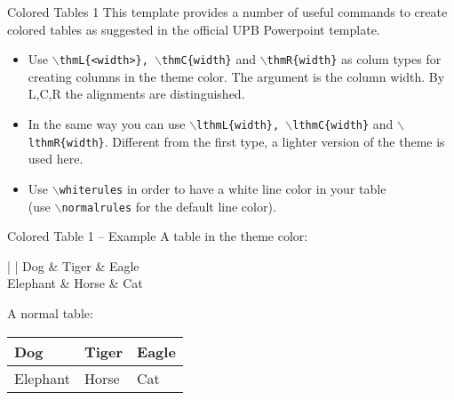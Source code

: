 \documentclass[
		aspectratio=169
	] {beamer}
\begin{document}
\begin{frame}{Colored Tables 1}
	This template provides a number of useful commands to create colored tables as
	suggested in the official UPB Powerpoint template.
	\begin{itemize}
		\item Use \texttt{$\backslash$thmL\{<width>\}, $\backslash$thmC\{width\}} and
			\texttt{$\backslash$thmR\{width\}} as colum types for creating columns in
			the theme color. The argument is the column width. By L,C,R the
			alignments are distinguished.

		\item In the same way you can use \texttt{$\backslash$lthmL\{width\},
			$\backslash$lthmC\{width\}} and \texttt{$\backslash$lthmR\{width\}}.
			Different from the first type, a lighter version of the theme is used here.

		\item Use \texttt{$\backslash$whiterules} in order to have a white line
			color in your table\\
			(use \texttt{$\backslash$normalrules} for the default line color).
	\end{itemize}
\end{frame}



\begin{frame}{Colored Table 1 -- Example}
	A table in the theme color:

	\begin{center}
		\whiterules
		\begin{tabular}{\thmC{3cm} | \lthmC{3cm} | \thmC{3cm}}
			Dog & Tiger & Eagle\\
			\hline
			Elephant & Horse & Cat
		\end{tabular}
	\end{center}

	\vfill
	A normal table:

	\begin{center}
		\normalrules
		\begin{tabular}{p{3cm} | p{3cm} | p{3cm}}
			Dog & Tiger & Eagle\\
			\hline
			Elephant & Horse & Cat
		\end{tabular}
	\end{center}
\end{frame}
\end{document}
